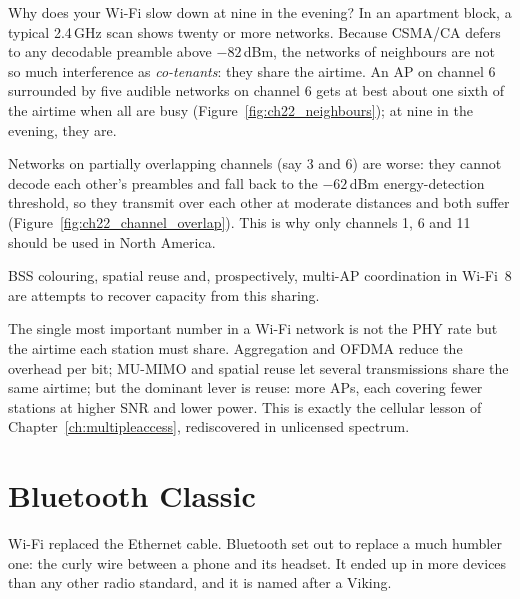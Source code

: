 Why does your Wi-Fi slow down at nine in the evening? In an apartment block, a typical 2.4\,GHz scan
shows twenty or more networks. Because CSMA/CA defers to any decodable preamble above $-82$\,dBm, the
networks of neighbours are not so much interference as \emph{co-tenants}: they share the airtime.
An AP on channel 6 surrounded by five audible networks on channel 6 gets at best about one sixth of
the airtime when all are busy (Figure~\ref{fig:ch22_neighbours}); at nine in the evening, they are.

Networks on partially overlapping channels (say 3 and 6) are worse: they cannot decode each other's
preambles and fall back to the $-62$\,dBm energy-detection threshold, so they transmit over each
other at moderate distances and both suffer (Figure~\ref{fig:ch22_channel_overlap}). This is why only
channels 1, 6 and 11 should be used in North America.

 BSS colouring, spatial reuse and, prospectively, multi-AP coordination in Wi-Fi~8 are
attempts to recover capacity from this sharing.

\begin{keyidea}
The single most important number in a Wi-Fi network is not the PHY rate but the airtime each
station must share. Aggregation and OFDMA reduce the overhead per bit; MU-MIMO and spatial reuse let
several transmissions share the same airtime; but the dominant lever is reuse: more APs, each
covering fewer stations at higher SNR and lower power. This is exactly the cellular lesson of
Chapter~\ref{ch:multipleaccess}, rediscovered in unlicensed spectrum.
\end{keyidea}

\section{Bluetooth Classic}
\label{sec:ch22:btclassic}

Wi-Fi replaced the Ethernet cable. Bluetooth set out to replace a much humbler one: the curly wire
between a phone and its headset. It ended up in more devices than any other radio standard, and it
is named after a Viking.


